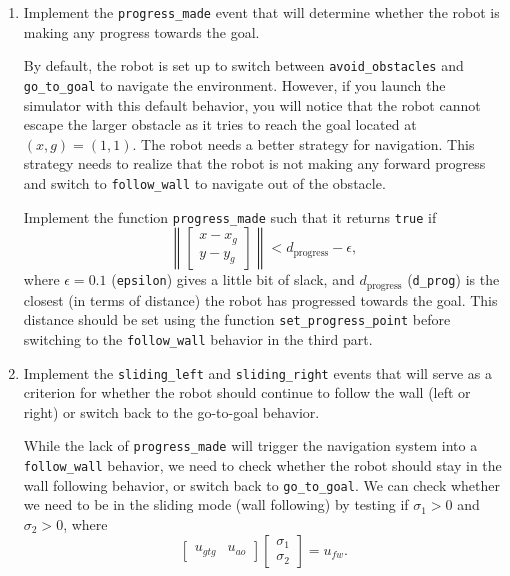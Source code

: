\documentclass[10pt]{article}
\begin{document}
\begin{enumerate}
  \item Implement the \texttt{progress\_made} event that will determine whether the robot is making any progress towards the goal.
  
  By default, the robot is set up to switch between \texttt{avoid\_obstacles} and \texttt{go\_to\_goal} to navigate the environment. However, if you launch the simulator with this default behavior, you will notice that the robot cannot escape the larger obstacle as it tries to reach the goal located at $(x,g)=(1,1)$. The robot needs a better strategy for navigation. This strategy needs to realize that the robot is not making any forward progress and switch to \texttt{follow\_wall} to navigate out of the obstacle.
  
  Implement the function \texttt{progress\_made} such that it returns \texttt{true} if
  \begin{equation*}
    \left\|\begin{bmatrix} x-x_g \\ y-y_g \end{bmatrix}\right\| < d_{\text{progress}}-\epsilon,
  \end{equation*}
  where $\epsilon=0.1$ (\texttt{epsilon}) gives a little bit of slack, and $d_{\text{progress}}$ (\texttt{d\_prog}) is the closest (in terms of distance) the robot has progressed towards the goal. This distance should be set using the function \texttt{set\_progress\_point} before switching to the \texttt{follow\_wall} behavior in the third part.

  \item Implement the \texttt{sliding\_left} and \texttt{sliding\_right} events that will serve as a criterion for whether the robot should continue to follow the wall (left or right) or switch back to the go-to-goal behavior.
  
  While the lack of \texttt{progress\_made} will trigger the navigation system into a \texttt{follow\_wall} behavior, we need to check whether the robot should stay in the wall following behavior, or switch back to \texttt{go\_to\_goal}. We can check whether we need to be in the sliding mode (wall following) by testing if $\sigma_1>0$ and $\sigma_2>0$, where
  \begin{equation*}
    \begin{bmatrix}u_{gtg} & u_{ao}\end{bmatrix}\begin{bmatrix}\sigma_1 \\ \sigma_2\end{bmatrix} = u_{fw}.
  \end{equation*}
  

\end{enumerate}
\end{document}
